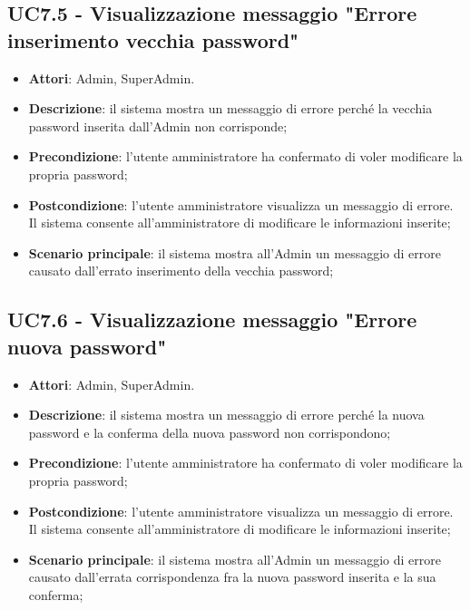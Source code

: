 \documentclass[../AnalisiDeiRequisiti_v3.0.0.tex]{subfiles}
\begin{document}
\subsection{UC7.5 - Visualizzazione messaggio "Errore inserimento vecchia password"} 
\label{sssec:UC7.5} 
\begin{itemize} 
\item \textbf{Attori}: Admin, SuperAdmin.
\item \textbf{Descrizione}: il sistema mostra un messaggio di errore perché la vecchia password inserita dall'Admin non corrisponde;
\item \textbf{Precondizione}: l'utente amministratore ha confermato di voler modificare la propria password;
\item \textbf{Postcondizione}: l'utente amministratore visualizza un messaggio di errore. Il sistema consente all'amministratore di modificare le informazioni inserite;
\item \textbf{Scenario principale}: il sistema mostra all'Admin un messaggio di errore causato dall'errato inserimento della vecchia password;
\end{itemize} 
\subsection{UC7.6 - Visualizzazione messaggio "Errore nuova password"} 
\label{sssec:UC7.6} 
\begin{itemize} 
\item \textbf{Attori}: Admin, SuperAdmin.
\item \textbf{Descrizione}: il sistema mostra un messaggio di errore perché la nuova password e la conferma della nuova password non corrispondono;
\item \textbf{Precondizione}: l'utente amministratore ha confermato di voler modificare la propria password;
\item \textbf{Postcondizione}: l'utente amministratore visualizza un messaggio di errore. Il sistema consente all'amministratore di modificare le informazioni inserite;
\item \textbf{Scenario principale}: il sistema mostra all'Admin un messaggio di errore causato dall'errata corrispondenza fra la nuova password inserita e la sua conferma;

\end{itemize} 
\newpage
\end{document}
